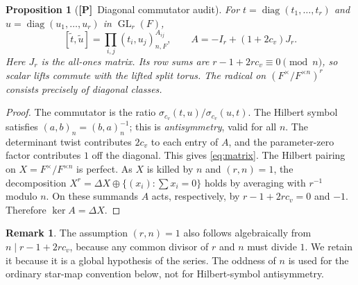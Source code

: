 \documentclass[11pt]{article}
\newcommand{\GL}{\operatorname{GL}}
\newcommand{\Ptag}{\textnormal{\textbf{[P]}}}
\theoremstyle{plain}
\newtheorem{proposition}[theorem]{Proposition}
\theoremstyle{definition}
\newtheorem{remark}[theorem]{Remark}
\begin{document}
\begin{proposition}[\Ptag\ Diagonal commutator audit]\label{prop:diag}
For $t=\operatorname{diag}(t_1,\ldots,t_r)$ and
$u=\operatorname{diag}(u_1,\ldots,u_r)$ in $\GL_r(F)$,
\begin{equation}\label{eq:matrix}
 [\widetilde t,\widetilde u]
 =\prod_{i,j}(t_i,u_j)_{n,F}^{A_{ij}},\qquad
 A=-I_r+(1+2c_v)J_r.
\end{equation}
Here $J_r$ is the all-ones matrix.  Its row sums are
$r-1+2rc_v\equiv0\pmod n$, so scalar lifts commute with the lifted
split torus.  The radical on $(F^\times/F^{\times n})^r$ consists
precisely of diagonal classes.
\end{proposition}
\begin{proof}
The commutator is the ratio
$\sigma_{c_v}(t,u)/\sigma_{c_v}(u,t)$.
The Hilbert symbol satisfies $(a,b)_n=(b,a)_n^{-1}$; this is
\emph{antisymmetry}, valid for all $n$.  The determinant twist
contributes $2c_v$ to each entry of $A$, and the parameter-zero
factor contributes $1$ off the diagonal.  This gives \eqref{eq:matrix}.
The Hilbert pairing on $X=F^\times/F^{\times n}$ is perfect.
As $X$ is killed by $n$ and $(r,n)=1$, the decomposition
$X^r=\Delta X\oplus\{(x_i):\sum x_i=0\}$ holds by averaging with
$r^{-1}$ modulo $n$.  On these summands $A$ acts, respectively, by
$r-1+2rc_v=0$ and $-1$.  Therefore $\ker A=\Delta X$.
\end{proof}

\begin{remark}
The assumption $(r,n)=1$ also follows algebraically from
$n\mid r-1+2rc_v$, because any common divisor of $r$ and $n$ must
divide $1$.  We retain it because it is a global hypothesis of the
series.  The oddness of $n$ is used for the ordinary star-map
convention below, not for Hilbert-symbol antisymmetry.
\end{remark}
\end{document}

